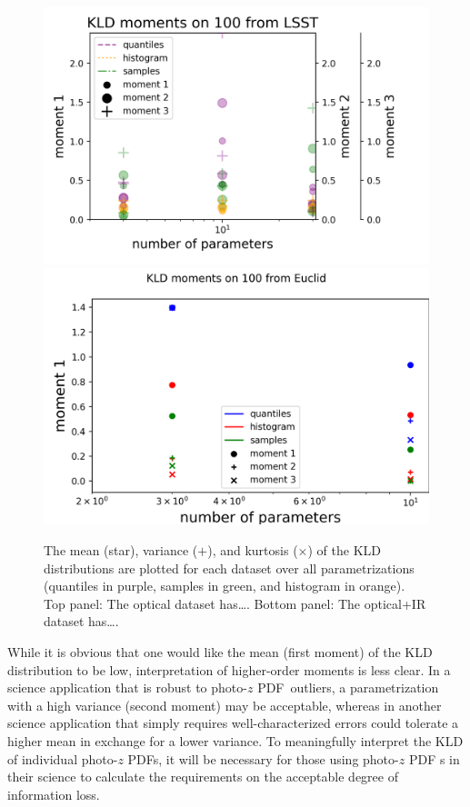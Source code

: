 \documentclass[\docopts]{\docclass}
\newcommand{\pz}{photo-$z$ PDF}
\begin{document}
\begin{figure}
  \includegraphics[width=0.9\columnwidth]{lsst_moments_placeholder.png}\\
  \includegraphics[width=0.9\columnwidth]{euclid_moments_placeholder.png}
  \caption{The mean (star), variance ($+$), and kurtosis ($\times$) of the KLD 
distributions are plotted for each dataset over all parametrizations (quantiles 
in purple, samples in green, and histogram in orange).  Top panel: The optical 
dataset has\dots.  Bottom panel: The optical+IR dataset has\dots.
  \label{fig:moments}}
\end{figure}

While it is obvious that one would like the mean (first moment) of the KLD 
distribution to be low, interpretation of higher-order moments is less clear.  
In a science application that is robust to \pz\ outliers, a parametrization 
with a high variance (second moment) may be acceptable, whereas in another 
science application that simply requires well-characterized errors could 
tolerate a higher mean in exchange for a lower variance.  To meaningfully 
interpret the KLD of individual \pz s, it will be necessary for those using \pz 
s in their science to calculate the requirements on the acceptable degree of 
information loss.
\end{document}
